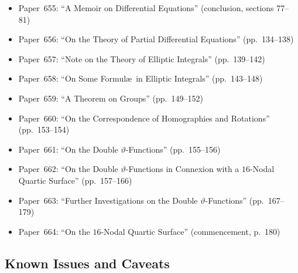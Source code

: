 \documentclass[11pt,a4paper]{article}
\theoremstyle{plain}
\theoremstyle{definition}
\begin{document}
\begin{itemize}[leftmargin=2em]
\item Paper~655: ``A Memoir on Differential Equations'' (conclusion, sections 77--81)
\item Paper~656: ``On the Theory of Partial Differential Equations'' (pp.~134--138)
\item Paper~657: ``Note on the Theory of Elliptic Integrals'' (pp.~139--142)
\item Paper~658: ``On Some Formul\ae\ in Elliptic Integrals'' (pp.~143--148)
\item Paper~659: ``A Theorem on Groups'' (pp.~149--152)
\item Paper~660: ``On the Correspondence of Homographies and Rotations'' (pp.~153--154)
\item Paper~661: ``On the Double $\vartheta$-Functions'' (pp.~155--156)
\item Paper~662: ``On the Double $\vartheta$-Functions in Connexion with a $16$-Nodal Quartic Surface'' (pp.~157--166)
\item Paper~663: ``Further Investigations on the Double $\vartheta$-Functions'' (pp.~167--179)
\item Paper~664: ``On the $16$-Nodal Quartic Surface'' (commencement, p.~180)
\end{itemize}

\subsection*{Known Issues and Caveats}
\end{document}
